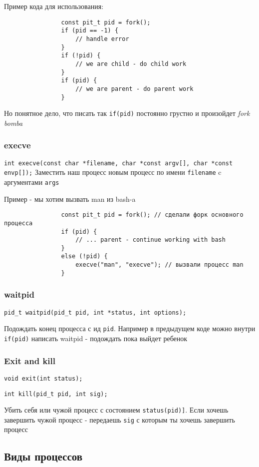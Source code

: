 \documentclass[12pt, a4paper]{scrartcl}
\begin{document}
				Пример кода для использования:
				\begin{verbatim}
				const pit_t pid = fork();
				if (pid == -1) {
					// handle error
				}
				if (!pid) {
					// we are child - do child work
				}
				if (pid) {
					// we are parent - do parent work
				}
				\end{verbatim}
				
				Но понятное дело, что писать так \texttt{if(pid)} постоянно грустно и произойдет \textit{fork bomba}
			\subsubsection{execve}
				\texttt{int execve(const char *filename, char *const argv[], char *const envp[]);}
				Заместить наш процесс новым процесс по имени \texttt{filename} c аргументами \texttt{args}
				
				Пример - мы хотим вызвать man из bash-a
				
				\begin{verbatim}
				const pit_t pid = fork(); // сделали форк основного процесса
				if (pid) {
					// ... parent - continue working with bash
				}
				else (!pid) {
					execve("man", "execve"); // вызвали процесс man 
				}
				\end{verbatim}
			\subsubsection{waitpid}
				\texttt{pid_t waitpid(pid_t pid, int *status, int options);}
				
				Подождать конец процесса с ид \texttt{pid}.
				Например в предыдущем коде можно внутри \texttt{if(pid)} написать waitpid - подождать пока выйдет ребенок
			\subsubsection{Exit and kill}
				\texttt{void exit(int status);}\par
				\texttt{int kill(pid_t pid, int sig);}\par
				Убить себя или чужой процесс с состоянием \texttt{status(pid)]}. Если хочешь завершить чужой процесс - передаешь \texttt{sig} с которым ты хочешь завершить процесс
		\subsection	{Виды процессов}
\end{document}
